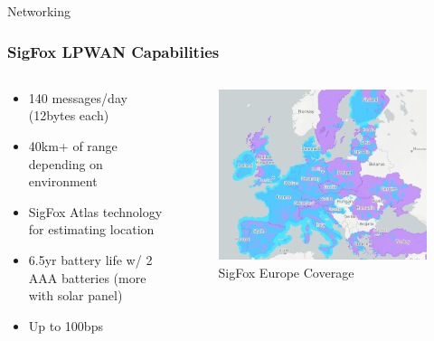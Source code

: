 \documentclass{beamer}
\begin{document}
  \begin{frame}{Networking}
    \frametitle{SigFox LPWAN Capabilities}
    \begin{columns}
      \begin{column}{0.5\textwidth}
        \begin{itemize}
          \item 140 messages/day (12bytes each)
          \item 40km+ of range depending on environment
          \item SigFox Atlas technology for estimating location
          \item 6.5yr battery life w/ 2 AAA batteries (more with solar panel)
          \item Up to 100bps
        \end{itemize}
      \end{column}
      \begin{column}{0.5\textwidth}
        \begin{figure}[htbp]
          \centering
          \includegraphics[width=\textwidth]{SigFoxCoverage.png}
          \caption{SigFox Europe Coverage \cite{Sigfox_0G_Technology_2024}}
          \label{fig:SigFox_Coverage}
        \end{figure}
      \end{column}
    \end{columns}
  \end{frame}
\end{document}
